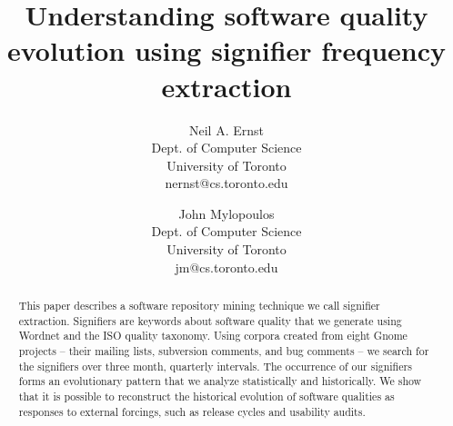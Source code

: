 \documentclass[conference, compsoc]{IEEEtran}
\begin{document}

 
\title{Understanding software quality evolution using signifier frequency extraction}
\author{
Neil A. Ernst\\Dept. of Computer Science\\University of Toronto\\nernst@cs.toronto.edu \and
John Mylopoulos\\Dept. of Computer Science\\University of Toronto\\jm@cs.toronto.edu }

\maketitle

\begin{abstract}
This paper describes a software repository mining technique we call signifier extraction. Signifiers are keywords about software quality that we generate using Wordnet and the ISO quality taxonomy. Using corpora created from eight Gnome projects -- their mailing lists, subversion comments, and bug comments -- we search for the signifiers over three month, quarterly intervals. The occurrence of our signifiers forms an evolutionary pattern that we analyze statistically and historically. We show that it is possible to reconstruct the historical evolution of software qualities as responses to external forcings, such as release cycles and usability audits. %
\end{abstract}
\end{document}
